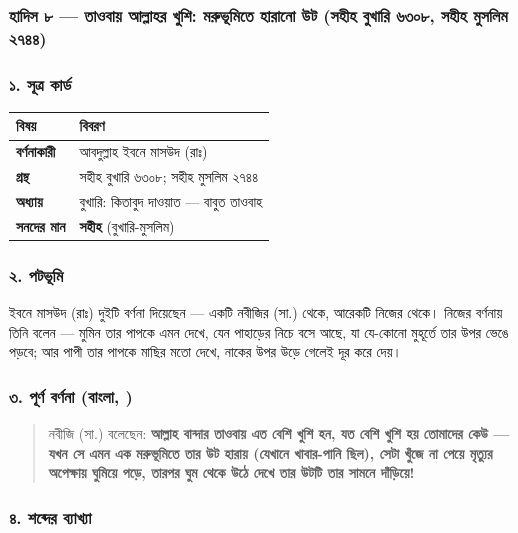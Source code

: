 \subsubsection*{হাদিস ৮ — তাওবায় আল্লাহর খুশি: মরুভূমিতে হারানো উট (সহীহ বুখারি ৬৩০৮, সহীহ মুসলিম ২৭৪৪)}

\subsubsection*{১. সূত্র কার্ড}

\begin{table}[h]\centering\small
\begin{tabular}{ll}
বিষয় & বিবরণ \\
\hline
\textbf{বর্ণনাকারী} & আবদুল্লাহ ইবনে মাসউদ (রাঃ) \\
\textbf{গ্রন্থ} & সহীহ বুখারি ৬৩০৮; সহীহ মুসলিম ২৭৪৪ \\
\textbf{অধ্যায়} & বুখারি: কিতাবুদ দাওয়াত — বাবুত তাওবাহ \\
\textbf{সনদের মান} & \textbf{সহীহ} (বুখারি-মুসলিম) \\
\hline
\end{tabular}
\end{table}

\subsubsection*{২. পটভূমি}

ইবনে মাসউদ (রাঃ) দুইটি বর্ণনা দিয়েছেন — একটি নবীজির (সা.) থেকে, আরেকটি নিজের থেকে। নিজের বর্ণনায় তিনি বলেন — মুমিন তার পাপকে এমন দেখে, যেন পাহাড়ের নিচে বসে আছে, যা যে-কোনো মুহূর্তে তার উপর ভেঙে পড়বে; আর পাপী তার পাপকে মাছির মতো দেখে, নাকের উপর উড়ে গেলেই দূর করে দেয়।

\subsubsection*{৩. পূর্ণ বর্ণনা (বাংলা, )}

\begin{quote}
নবীজি (সা.) বলেছেন: \textbf{আল্লাহ বান্দার তাওবায় এত বেশি খুশি হন, যত বেশি খুশি হয় তোমাদের কেউ — যখন সে এমন এক মরুভূমিতে তার উট হারায় (যেখানে খাবার-পানি ছিল), সেটা খুঁজে না পেয়ে মৃত্যুর অপেক্ষায় ঘুমিয়ে পড়ে, তারপর ঘুম থেকে উঠে দেখে তার উটটি তার সামনে দাঁড়িয়ে!}
\end{quote}

\subsubsection*{৪. শব্দের ব্যাখ্যা}

